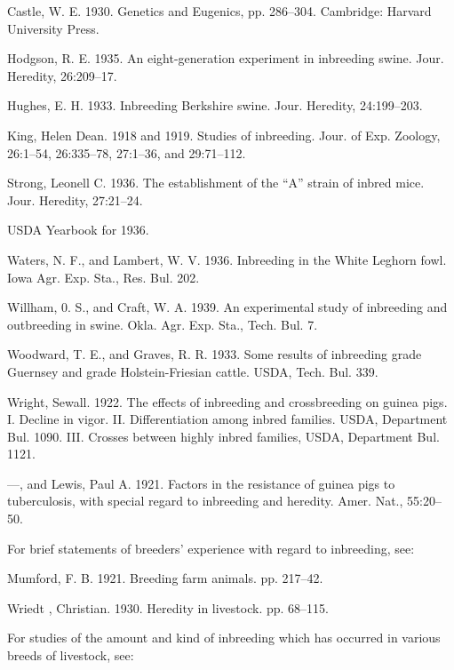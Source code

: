 \begin{hangparas}{0.5in}{1}%
Castle, W. E. 1930. Genetics and Eugenics, pp. 286--304. Cambridge: Harvard University
Press.

Hodgson, R. E. 1935. An eight-generation experiment in inbreeding swine. Jour.
Heredity, 26:209--17.

Hughes, E. H. 1933. Inbreeding Berkshire swine. Jour. Heredity, 24:199--203.

King, Helen Dean. 1918 and 1919. Studies of inbreeding. Jour. of Exp. Zoology,
26:1--54, 26:335--78, 27:1--36, and 29:71--112.

Strong, Leonell C. 1936. The establishment of the ``A'' strain of inbred mice. Jour.
Heredity, 27:21--24.

USDA Yearbook for 1936.

Waters, N. F., and Lambert, W. V. 1936. Inbreeding in the White Leghorn fowl.
Iowa Agr. Exp. Sta., Res. Bul. 202.

Willham, 0. S., and Craft, W. A. 1939. An experimental study of inbreeding and
outbreeding in swine. Okla. Agr. Exp. Sta., Tech. Bul. 7.

Woodward, T. E., and Graves, R. R. 1933. Some results of inbreeding grade Guernsey
and grade Holstein-Friesian cattle. USDA, Tech. Bul. 339.

Wright, Sewall. 1922. The effects of inbreeding and crossbreeding on guinea pigs.
I. Decline in vigor. II. Differentiation among inbred families. USDA,
Department Bul. 1090. III. Crosses between highly inbred families, USDA,
Department Bul. 1121.

---, and Lewis, Paul A. 1921. Factors in the resistance of guinea pigs to tuberculosis,
with special regard to inbreeding and heredity. Amer. Nat., 55:20--50.
\end{hangparas}

For brief statements of breeders' experience with regard to inbreeding,
see:

\begin{hangparas}{0.5in}{1}%
Mumford, F. B. 1921. Breeding farm animals. pp. 217--42.

Wriedt , Christian. 1930. Heredity in livestock. pp. 68--115.
\end{hangparas}

For studies of the amount and kind of inbreeding which has
occurred in various breeds of livestock, see:

